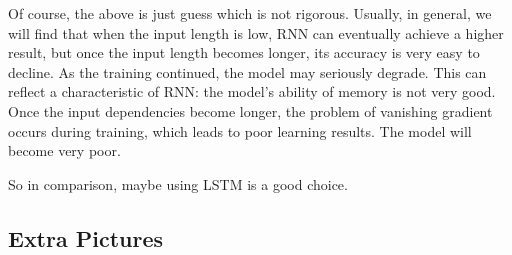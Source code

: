 \documentclass{article}
\begin{document}
Of course, the above is just guess which is not rigorous. Usually, in general, we will find that when the input length is low, RNN can eventually achieve a higher result, but once the input length becomes longer, its accuracy is very easy to decline. As the training continued, the model may seriously degrade. This can reflect a characteristic of RNN: the model's ability of memory is not very good. Once the input dependencies become longer, the problem of vanishing gradient occurs during training, which leads to poor learning results. The model will become very poor.

So in comparison, maybe using LSTM is a good choice.

\newpage

\begin{appendix}

\section{Extra Pictures}


\end{appendix}
\end{document}
